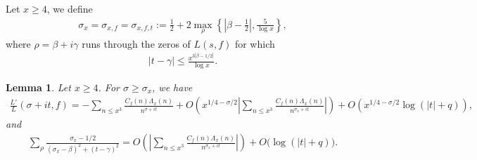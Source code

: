 \documentclass[11pt,reqno]{amsart}
\newcommand{\bea}{\begin{eqnarray}}
\newcommand{\eea}{\end{eqnarray}}
\newcommand{\bna}{\begin{eqnarray*}}
\newcommand{\ena}{\end{eqnarray*}}
\numberwithin{equation}{section}
\theoremstyle{plain}
\newtheorem{lemma}{Lemma}[section]
\theoremstyle{definition}
\begin{document}
Let $x\geq 4$, we define
\bea\label{sigma_x}
\sigma_x=\sigma_{x,f}=\sigma_{x,f,t}:=\frac{1}{2}+2\max_\rho\left\{\left|\beta-\frac{1}{2}\right|, \frac{5}{\log x}\right\},
\eea
where $\rho=\beta+i\gamma$ runs through the zeros of $L(s,f)$ for which
\bea\label{condition 1}
|t-\gamma|\leq\frac{x^{3|\beta-1/2|}}{\log x}.
\eea
\begin{lemma}\label{lemma 3}
Let $x\geq 4$. For $\sigma\geq \sigma_x$, we have
\bna
\frac{L'}{L}(\sigma+it,f)=-\sum_{n\leq x^3} \frac{C_f(n)\Lambda_x(n)}{n^{\sigma+it}}
+O\left(x^{1/4-\sigma/2}\left|\sum_{n\leq x^3} \frac{C_f(n)\Lambda_x(n)}{n^{\sigma_x+it}}\right|\right)
+O\left(x^{1/4-\sigma/2}\log(|t|+q)\right),
\ena
and
\bna
\sum_\rho\frac{\sigma_x-1/2}{(\sigma_x-\beta)^2+(t-\gamma)^2}=
O\left(\left|\sum_{n\leq x^3} \frac{C_f(n)\Lambda_x(n)}{n^{\sigma_x+it}}\right|\right)
+O\big(\log(|t|+q)\big).
\ena
\end{lemma}
\end{document}
